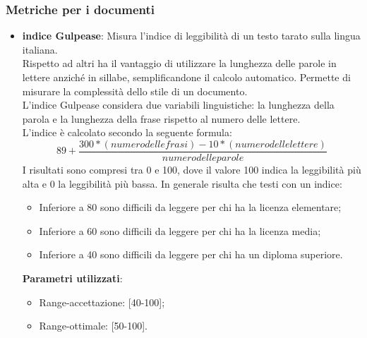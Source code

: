 \subsubsection{Metriche per i documenti}
\label{sec:metricadocumenti}
\begin{itemize}
\item \textbf{indice Gulpease}: Misura l'indice di leggibilità di un testo tarato sulla lingua italiana.\\
Rispetto ad altri ha il vantaggio di utilizzare la lunghezza delle parole in lettere anziché in sillabe, semplificandone il calcolo automatico. Permette di misurare la complessità dello stile di un documento.\\
L'indice Gulpease considera due variabili linguistiche: la lunghezza della parola e la lunghezza della frase rispetto al numero delle lettere.\\
L'indice è calcolato secondo la seguente formula:\\

\begin{equation}
89 + \frac{300 *(numero delle frasi) -10 *(numero delle lettere)}{numero delle parole}
\end{equation}
I risultati sono compresi tra 0 e 100, dove il valore 100 indica la leggibilità più alta e 0 la leggibilità più bassa. In generale risulta che testi con un indice:

\begin{itemize}
\item Inferiore a 80 sono difficili da leggere per chi ha la licenza elementare;
\item Inferiore a 60 sono difficili da leggere per chi ha la licenza media;
\item Inferiore a 40 sono difficili da leggere per chi ha un diploma superiore.
\end{itemize}

\textbf{Parametri utilizzati}:
\begin{itemize}
\item Range-accettazione: [40-100];
\item Range-ottimale: [50-100].
\end{itemize}
\end{itemize}